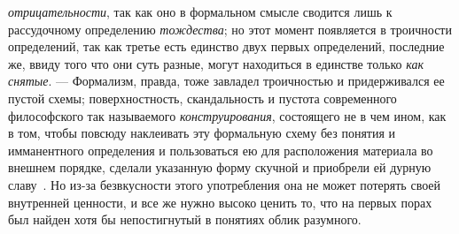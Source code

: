 \documentclass[twoside]{article}
\begin{document}
{{{\em отрицательности},
так как оно в формальном смысле сводится лишь к рассудочному
определению {\em тождества};
но этот момент появляется в троичности определений, так как
третье есть единство двух первых определений, последние же, ввиду того что
они суть разные, могут находиться в единстве только
{\em как снятые}. —
Формализм, правда, тоже завладел троичностью и
придерживался ее пустой схемы; поверхностность, скандальность и пустота
современного философского так называемого
{\em конструирования},
состоящего не в чем ином, как в том, чтобы повсюду наклеивать
эту формальную схему без понятия и имманентного определения и пользоваться
ею для расположения материала во внешнем порядке, сделали указанную форму
скучной и приобрели ей дурную
славу~\label{bkm:bm127}.
Но из-за безвкусности этого употребления она не может
потерять своей внутренней ценности, и все же нужно высоко ценить то, что на
первых порах был найден хотя бы непостигнутый в понятиях облик разумного.

}}
\end{document}
